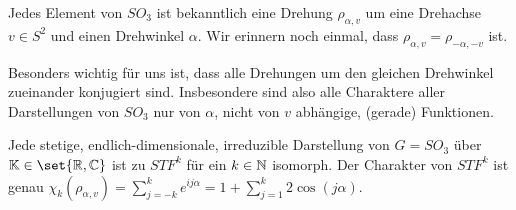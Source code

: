 
\begin{remark}
Jedes Element von $SO_3$ ist bekanntlich eine Drehung $\rho_{\alpha,v}$ um eine Drehachse $v\in S^2$ und einen Drehwinkel $\alpha$. Wir erinnern noch einmal, dass $\rho_{\alpha,v} =\rho_{-\alpha,-v}$ ist.

\smallbreak
Besonders wichtig für uns ist, dass alle Drehungen um den gleichen Drehwinkel zueinander konjugiert sind. Insbesondere sind also alle Charaktere aller Darstellungen von $SO_3$ nur von $\alpha$, nicht von $v$ abhängige, (gerade) Funktionen.
\end{remark}

\begin{theorem}
Jede stetige, endlich-dimensionale, irreduzible Darstellung von $G=SO_3$ über $\IK\in\set{\IR,\IC}$ ist zu $STF^k$ für ein $k\in\mathbb{N}$ isomorph. Der Charakter von $STF^k$ ist genau $\chi_k(\rho_{\alpha,v}) = \sum_{j=-k}^k e^{ij\alpha} = 1+\sum_{j=1}^k 2\cos(j\alpha)$. 
\end{theorem}
